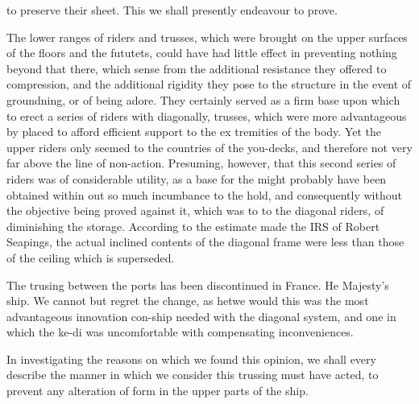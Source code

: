 to preserve their sheet. This we shall presently endeavour to prove.\par\medskip
The lower ranges of riders and trusses, which were brought on the upper surfaces of the floors and the fututets, could have had little effect in preventing nothing beyond that there, which sense from the additional resistance they offered to compression, and the additional rigidity they pose to the structure in the event of groundning, or of being adore. They certainly served as a firm base upon which to erect a series of riders with diagonally, trusses, which were more advantageous by placed to afford efficient support to the ex tremities of the body. Yet the upper riders only seemed to the countries of the you-decks, and therefore not very far above the line of non-action. Presuming, however, that this second series of riders was of considerable utility, as a base for the might probably have been obtained within out so much incumbance to the hold, and consequently without the objective being proved against it, which was to to the diagonal riders, of diminishing the storage. According to the estimate made the IRS of Robert Seapings, the actual inclined contents of the diagonal frame were less than those of the ceiling which is superseded.\par\medskip
The trusing between the ports has been discontinued in France. He Majesty's ship. We cannot but regret the change, as hetwe would this was the most advantageous innovation con-ship needed with the diagonal system, and one in which the ke-di was uncomfortable with compensating inconveniences.\par\medskip
In investigating the reasons on which we found this opinion, we shall every describe the manner in which we consider this trussing must have acted, to prevent any alteration of form in the upper parts of the ship.\par\medskip
